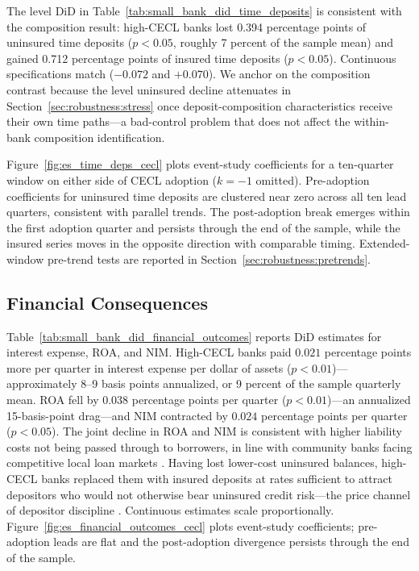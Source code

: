 The level DiD in Table~\ref{tab:small_bank_did_time_deposits} is
consistent with the composition result: high-CECL banks lost 0.394
percentage points of uninsured time deposits ($p<0.05$, roughly 7 percent
of the sample mean) and gained 0.712 percentage points of insured time
deposits ($p<0.05$).  Continuous specifications match ($-0.072$ and
$+0.070$).  We anchor on the composition contrast because the level
uninsured decline attenuates in Section~\ref{sec:robustness:stress} once
deposit-composition characteristics receive their own time paths---a
bad-control problem that does not affect the within-bank composition
identification.

Figure~\ref{fig:es_time_deps_cecl} plots event-study coefficients for a
ten-quarter window on either side of CECL adoption ($k=-1$ omitted).
Pre-adoption coefficients for uninsured time deposits are clustered near
zero across all ten lead quarters, consistent with parallel trends.  The
post-adoption break emerges within the first adoption quarter and
persists through the end of the sample, while the insured series moves in
the opposite direction with comparable timing.  Extended-window pre-trend
tests are reported in Section~\ref{sec:robustness:pretrends}.

\subsection{Financial Consequences}
\label{sec:results:financial}

Table~\ref{tab:small_bank_did_financial_outcomes} reports DiD estimates
for interest expense, ROA, and NIM.  High-CECL banks paid $0.021$
percentage points more per quarter in interest expense per dollar of
assets ($p<0.01$)---approximately 8--9 basis points annualized, or 9
percent of the sample quarterly mean.  ROA fell by $0.038$ percentage
points per quarter ($p<0.01$)---an annualized 15-basis-point drag---and
NIM contracted by $0.024$ percentage points per quarter ($p<0.05$).  The
joint decline in ROA and NIM is consistent with higher liability costs
not being passed through to borrowers, in line with community banks
facing competitive local loan markets \citep{hannan1988bank}.  Having
lost lower-cost uninsured balances, high-CECL banks replaced them with
insured deposits at rates sufficient to attract depositors who would not
otherwise bear uninsured credit risk---the price channel of depositor
discipline \citep{nier2006market, billett1998cost}.  Continuous estimates
scale proportionally.  Figure~\ref{fig:es_financial_outcomes_cecl} plots
event-study coefficients; pre-adoption leads are flat and the
post-adoption divergence persists through the end of the sample.
